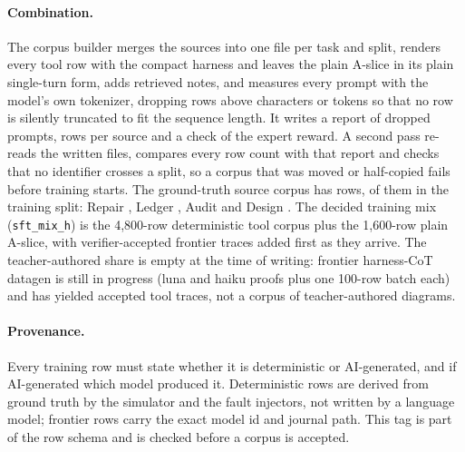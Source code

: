 \paragraph{Combination.}
The corpus builder merges the sources into one file per task and split, renders every tool row with the compact harness and leaves the plain A-slice in its plain single-turn form, adds retrieved notes, and measures every prompt with the model's own tokenizer, dropping rows above  characters or  tokens so that no row is silently truncated to fit the sequence length. It writes a report of dropped prompts, rows per source and a check of the expert reward. A second pass re-reads the written files, compares every row count with that report and checks that no identifier crosses a split, so a corpus that was moved or half-copied fails before training starts.
The ground-truth source corpus has  rows,  of them in the training split: Repair , Ledger , Audit  and Design . The decided training mix (\texttt{sft\_mix\_h}) is the 4,800-row deterministic tool corpus plus the 1,600-row plain A-slice, with verifier-accepted frontier traces added first as they arrive. The teacher-authored share is empty at the time of writing: frontier harness-CoT datagen is still in progress (luna and haiku proofs plus one 100-row batch each) and has yielded accepted tool traces, not a corpus of teacher-authored diagrams.

\paragraph{Provenance.}
Every training row must state whether it is deterministic or AI-generated, and if AI-generated which model produced it. Deterministic rows are derived from ground truth by the simulator and the fault injectors, not written by a language model; frontier rows carry the exact model id and journal path. This tag is part of the row schema and is checked before a corpus is accepted.

\begin{table}[tbp]
\centering

\caption{Teacher acceptance statistics, to be filled once the campaign completes. Frontier harness-CoT datagen is in progress with two authorized budget models (a five-row proof and one 100-row batch each); no model has been trained or evaluated, so the campaign-wide cells remain pending.}
\label{tab:corpusstatus}
\end{table}

